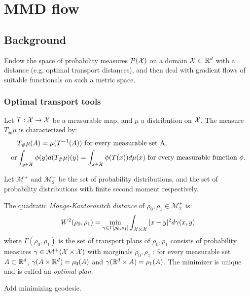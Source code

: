\section{MMD flow}


\subsection{Background}

Endow the space of probability measures $\mathcal{P}({{\mathcal X}})$ on a domain ${{\mathcal X}} \subset {{\mathbb R}}^d$ with a distance (e.g, optimal transport distances), and then deal with gradient flows of suitable functionals on such a metric space.



\subsubsection{Optimal transport tools}

Let $T: {{\mathcal X}} \rightarrow {{\mathcal X}}$ be a measurable map, and $\mu$ a distribution on ${{\mathcal X}}$. The measure $T_{\#}\mu$
is characterized by:
\begin{align*}
	&T_{\#}\mu(A) = \mu(T^{-1}(A)) \text{ for every measurable set A,}\\
\text{or}& \int_{y \in {{\mathcal X}}} \phi(y) d(T_{\#}\mu)(y) =\int_{x \in {{\mathcal X}}}\phi(T(x)) d\mu(x) \text{ for every measurable function $\phi$.}
\end{align*}

Let $\mathcal{M}^{+}$ and $\mathcal{M}_2^{+}$ be the set of probability distributions, and the set of probability distributions with finite second moment respectively.
\begin{definition}\label{def:mk}
	The quadratic \textit{Monge-Kantorovitch distance} of $\rho_0, \rho_1 \in \mathcal{M}_2^{+}$ is:
	\begin{equation}
		W^2(\rho_0, \rho_1)= \min_{\gamma \in \Gamma[\rho_0, \rho_1]} \int_{{{\mathcal X}} \times {{\mathcal X}}} |x-y|^2 d\gamma(x,y)
	\end{equation}
where $\Gamma(\rho_0,\rho_1)$ is the set of transport plans of $\rho_0, \rho_1$ consists of probability measures $\gamma \in \mathcal{M}^{+}({{\mathcal X}} \times {{\mathcal X}})$ with marginals $\rho_0, \rho_1$ : for every measurable set $A \subset {{\mathbb R}}^d$, $\gamma(A \times {{\mathbb R}}^d) = \rho_0(A)$ and $\gamma({{\mathbb R}}^d \times A) = \rho_1(A)$. 
	The minimizer is unique and is called an \textit{optimal plan}. 
\end{definition}

Add minimizing geodesic.

